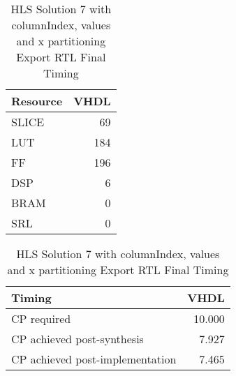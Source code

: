 \begin{table}[H]
	\centering
	\begin{minipage}[t]{0.45\linewidth}
		\centering
		\begin{tabular}{|l|r|}
			\hline
			\textbf{Resource} & \textbf{VHDL} \\
			\hline
			SLICE & 69 \\
			\hline
			LUT & 184 \\
			\hline
			FF & 196 \\
			\hline
			DSP & 6 \\
			\hline
			BRAM & 0 \\
			\hline
			SRL & 0 \\
			\hline
		\end{tabular}
		\caption{HLS Solution 7 with columnIndex, values and x partitioning Export RTL Resource Usage}
		\label{tab:hls-solution-7-columnindex-values-x-partitioning-export-rtl-resoruce-usage}
	\end{minipage}
	\hfill
	\begin{minipage}[t]{0.45\linewidth}
		\centering
		\begin{tabular}{|l|r|}
			\hline
			\textbf{Timing} & \textbf{VHDL} \\
			\hline
			CP required & 10.000 \\
			\hline
			CP achieved post-synthesis & 7.927 \\
			\hline
			CP achieved post-implementation & 7.465 \\
			\hline
		\end{tabular}
		\caption{HLS Solution 7 with columnIndex, values and x partitioning Export RTL Final Timing}
		\label{tab:hls-solution-7-columnindex-values-x-partitioning-export-rtl-final-timing}
	\end{minipage}
\end{table}